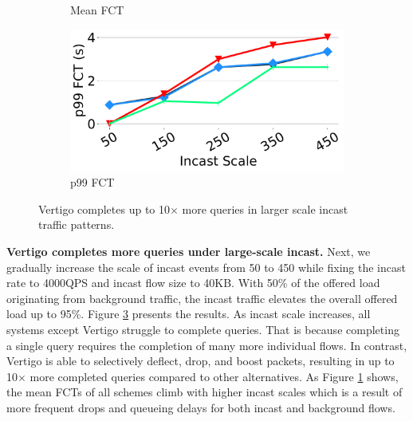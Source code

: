 \begin{figure}[t]
\begin{subfigure}[t]{.45\linewidth}
		\caption{\small{Mean FCT}}
		\label{fig:scale_fctall}
	\end{subfigure}
	\begin{subfigure}[t]{.45\linewidth}
	\centering
	\includegraphics[width=0.98\linewidth]{figs/scale50fctallp99.pdf}
		\caption{\small{p99 FCT}}
		\label{fig:scale_fctbursty}
	\end{subfigure}
	\vspace{-3mm}
	\caption{\small{Vertigo completes up to 10$\times$ more queries in larger scale incast traffic patterns.}}
	\label{fig:scale}
	
	\vspace{-2mm}
\end{figure}


\textbf{Vertigo completes more queries under large-scale incast.}
Next, we gradually increase the scale of incast events from 50 to 450 while fixing the incast rate to 4000QPS and incast flow size to 40KB. With 50\% of the offered load originating from background traffic, the incast traffic elevates the overall offered load up to 95\%. Figure \ref{fig:scale} presents the results. As incast scale increases, all systems except Vertigo struggle to complete queries. That is because completing a single query requires the completion of many more individual flows. In contrast, Vertigo is able to selectively deflect, drop, and boost packets, resulting in up to 10$\times$ more completed queries compared to other alternatives. As Figure \ref{fig:scale_fctall} shows, the mean FCTs of all schemes climb with higher incast scales which is a result of more frequent drops and queueing delays for both incast and background flows. 

